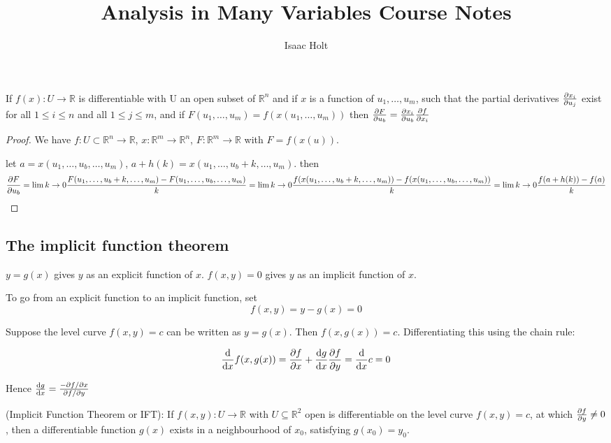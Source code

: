 

\title{Analysis in Many Variables Course Notes}
\author{Isaac Holt}





\begin{theorem}
	If $f(x): U \rightarrow \mathbb{R}$ is differentiable with U an open subset of $\mathbb{R}^n$ and if $x$ is a function of $u_1, \dots, u_m$, such that the partial derivatives $\diffp{x_i}{u_j}$ exist for all $1 \le i \le n$ and all $1 \le j \le m$, and if $F(u_1, \dots, u_m) = f(x(u_1, \dots, u_m))$ then $\diffp{F}{u_b} = \diffp{x_i}{u_b} \diffp{f}{x_i}$
\end{theorem}

\begin{proof}
	We have $f: U \subset \mathbb{R}^n \rightarrow \mathbb{R}$, $x: \mathbb{R}^m \rightarrow \mathbb{R}^n$, $F: \mathbb{R}^m \rightarrow \mathbb{R}$ with $F = f(x(u))$.

	let $a = x(u_1, \dots, u_b, \dots, u_m)$, $a + h(k) = x(u_1, \dots, u_b + k, \dots, u_m)$. then
	\[\diffp{F}{u_b} = \lim{k \rightarrow 0}{\frac{F(u_1, \dots, u_b + k, \dots, u_m) - F(u_1, \dots, u_b, \dots, u_m)}{k}} = \lim{k \rightarrow 0}{\frac{f(x(u_1, \dots, u_b + k, \dots, u_m)) - f(x(u_1, \dots, u_b, \dots, u_m))}{k}} = \lim{k \rightarrow 0}{\frac{f(a + h(k)) - f(a)}{k}}\]
\end{proof}

\subsection{The implicit function theorem}

$y = g(x)$ gives $y$ as an explicit function of $x$. $f(x, y) = 0$ gives $y$ as an implicit function of $x$.

To go from an explicit function to an implicit function, set \[f(x, y) = y - g(x) = 0\]

Suppose the level curve $f(x, y) = c$ can be written as $y = g(x)$. Then $f(x, g(x)) = c$. Differentiating this using the chain rule:

\[\diff{}{x}f(x, g(x)) = \diffp{f}{x} + \diff{g}{x}\diffp{f}{y} = \diff{}{x}c = 0\]

Hence $\diff{g}{x} = \frac{- \partial f / \partial x}{\partial f / \partial y}$

\begin{theorem}
	(Implicit Function Theorem or IFT): If $f(x, y): U \rightarrow \mathbb{R}$ with $U \subseteq \mathbb{R}^2$ open is differentiable on the level curve $f(x, y) = c$, at which $\diffp{f}{y} \ne 0$, then a differentiable function $g(x)$ exists in a neighbourhood of $x_0$, satisfying $g(x_0) = y_0$.
\end{theorem}

